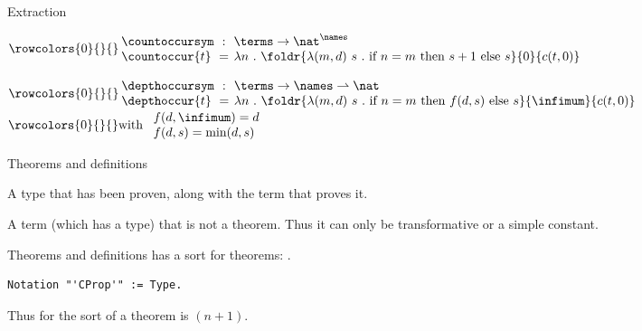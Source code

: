 \documentclass[department=ds, notes={hide notes}, slidesperpage=1]{beamerruhuisstijl}
\begin{document}
\begin{frame}{Extraction}
	\begin{definition}
	$
	\rowcolors{0}{}{}
	\arraycolsep=0.2em
	\begin{array}{lcl}
		\countoccursym & : & \terms \rightarrow \nat^{\names} \\
		\countoccur{t} & = & \lambda n ~.~ \foldr{\lambda (m, d)~s ~.~ \text{if~} n = m \text{~then~} s+1 \text{~else~} s}{0}{c(t, 0)}
	\end{array}
	$\\
	\end{definition}
	\bigskip
	\begin{definition}[Depth of symbols $\depthoccursym$]
	$
		\rowcolors{0}{}{}
		\arraycolsep=0.2em
		\begin{array}{lcl}
		\depthoccursym & : & \terms \rightarrow \names \rightharpoonup \nat \\
		\depthoccur{t} & = & \lambda n ~.~ \foldr{\lambda (m, d)~s ~.~ \text{if~} n = m \text{~then~} f(d, s) \text{~else~} s}{\infimum}{c(t, 0)} \\
		\end{array}
	$\\
	\bigskip
	$
		\rowcolors{0}{}{}
		\text{with~} \begin{array}{l}
			f(d, \infimum) = d \\
			f(d, s) = \text{min}(d, s) \\
		\end{array}
	$
	\end{definition}
\end{frame}

\begin{frame}{Theorems and definitions}
	\begin{definition}[Theorem]
		A type that has been proven, along with the term that proves it.
	\end{definition}
	\bigskip
	\begin{definition}[Definition]
		A term (which has a type) that is not a theorem.
		Thus it can only be transformative or a simple constant.
	\end{definition}
\end{frame}

\begin{frame}[fragile]{Theorems and definitions}
	\coq has a sort for theorems: \sortprop.
	\pause
	\bigskip
\begin{lstlisting}[language=Coq, mathescape]
Notation "'CProp'" := Type.
\end{lstlisting}
	\bigskip
	Thus for \corn the sort of a theorem is \sorttype{}$(n+1)$.
\end{frame}
\end{document}
